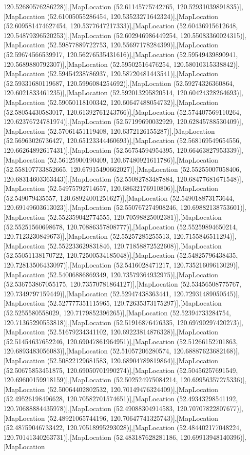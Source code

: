 120.52680576286228)],[MapLocation (52.61145775742765, 120.52931039891835)],[MapLocation (52.61005055286454, 120.53523271642324)],[MapLocation (52.609581474627454, 120.5377647217333)],[MapLocation (52.60436915612648, 120.54879396520253)],[MapLocation (52.602946986449254, 120.55083360024315)],[MapLocation (52.59877889722753, 120.55697178284399)],[MapLocation (52.59674566539917, 120.56276535431616)],[MapLocation (52.59549439890941, 120.5689880792307)],[MapLocation (52.59502516476254, 120.58010315338842)],[MapLocation (52.59454238786937, 120.58720481443541)],[MapLocation (52.59331680119687, 120.5996084254692)],[MapLocation (52.59274326360864, 120.6021833461235)],[MapLocation (52.592013295820514, 120.60424328264693)],[MapLocation (52.59050118100342, 120.60647488054732)],[MapLocation (52.58054430583017, 120.61392761243766)],[MapLocation (52.574407569110264, 120.62376724781974)],[MapLocation (52.57199690032929, 120.62845788530409)],[MapLocation (52.57061451119408, 120.6372126155287)],[MapLocation (52.56963026736427, 120.65123344460693)],[MapLocation (52.568169549654556, 120.66264892617431)],[MapLocation (52.56754594954395, 120.66463827953339)],[MapLocation (52.56125900190409, 120.67480921611786)],[MapLocation (52.558107733852665, 120.67915490662027)],[MapLocation (52.55255007058406, 120.68314603363443)],[MapLocation (52.55082783487884, 120.68477681671548)],[MapLocation (52.54975792714657, 120.68632176910806)],[MapLocation (52.549079435557, 120.68924001251627)],[MapLocation (52.549018873173644, 120.69149603613023)],[MapLocation (52.550767274908246, 120.69882138753601)],[MapLocation (52.552359042774555, 120.70598825002381)],[MapLocation (52.55251560698678, 120.70886357808777)],[MapLocation (52.55259894650214, 120.7123230849673)],[MapLocation (52.55257285255513, 120.7155846511294)],[MapLocation (52.552233629831846, 120.71858872522608)],[MapLocation (52.55051138170722, 120.72500534185048)],[MapLocation (52.54825796438435, 120.72813506433097)],[MapLocation (52.5416028471217, 120.73521609613029)],[MapLocation (52.54006886869349, 120.73579364932975)],[MapLocation (52.536753867055175, 120.73570781864127)],[MapLocation (52.53456508775767, 120.7349797159449)],[MapLocation (52.52947438363441, 120.72931489050545)],[MapLocation (52.527777351115965, 120.72635373175297)],[MapLocation (52.5255580558029, 120.7179852396265)],[MapLocation (52.52394733284754, 120.71365290553818)],[MapLocation (52.51916876476335, 120.69790297420273)],[MapLocation (52.51679234341102, 120.69223814876328)],[MapLocation (52.51454637652246, 120.69047861964951)],[MapLocation (52.51266152701863, 120.6893483056083)],[MapLocation (52.51057206280574, 120.68887623682168)],[MapLocation (52.50822129681583, 120.68904789819864)],[MapLocation (52.50675853451875, 120.69050701990274)],[MapLocation (52.50456257691549, 120.69600159918159)],[MapLocation (52.502524975084214, 120.69956357275336)],[MapLocation (52.50064402802532, 120.70149476324409)],[MapLocation (52.49526198496628, 120.70582701574651)],[MapLocation (52.49343298541192, 120.70688884435978)],[MapLocation (52.49088304914583, 120.70707822807677)],[MapLocation (52.48921065744196, 120.70647741325743)],[MapLocation (52.48759046733422, 120.70518995293028)],[MapLocation (52.484402177048224, 120.70141340263731)],[MapLocation (52.483187628281186, 120.69913948140396)],[MapLocation 